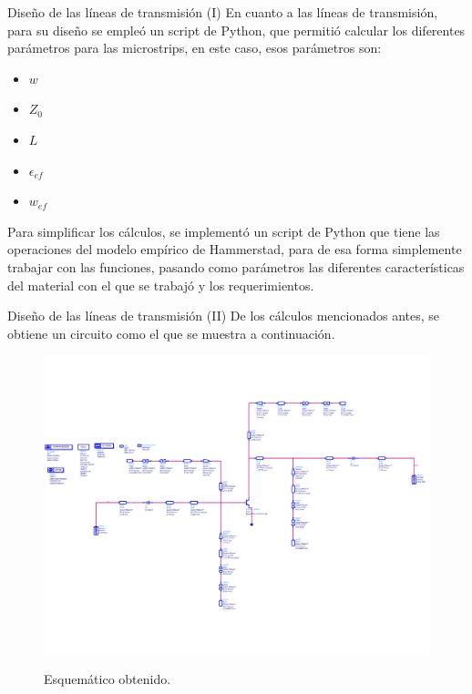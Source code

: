 \documentclass[9pt]{beamer}
\begin{document}
	\begin{frame}{Diseño de las líneas de transmisión (I)}
		En cuanto a las líneas de transmisión, para su diseño se empleó un script de Python, que permitió calcular los diferentes parámetros para las microstrips,  en este caso, esos parámetros son:
		
		\begin{itemize}[label=\textbullet]
			\item $w$
			\item $Z_0$
			\item $L$
			\item $\epsilon_{ef}$
			\item $w_{ef}$
		\end{itemize}
		
		Para simplificar los cálculos, se implementó un script de Python que tiene las operaciones del modelo empírico de Hammerstad, para de esa forma simplemente trabajar con las funciones, pasando como parámetros las diferentes características del material con el que se trabajó y los requerimientos.
		
	\end{frame}
	
	\begin{frame}{Diseño de las líneas de transmisión (II)}
		De los cálculos mencionados antes, se obtiene un circuito como el que se muestra a continuación.
		
		\begin{figure}
			\centering
			\includegraphics[width=0.8\linewidth]{img/sch_ads}
			\label{fig:schads}
			\caption{Esquemático obtenido.}
		\end{figure}
		
	\end{frame}
	
\end{document}
